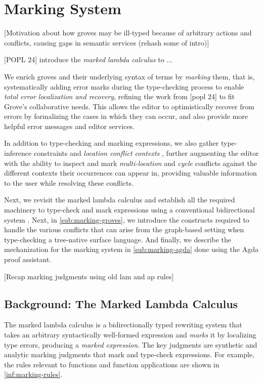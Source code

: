 
\section{Marking System}%
\label{sec:Marking System}

[Motivation about how groves may be ill-typed because of arbitrary actions and conflicts, causing gaps in semantic services (rehash some of intro)]

[POPL 24] introduce the \emph{marked lambda calculus} to ...

We enrich groves and their underlying syntax of terms by \emph{marking} them, that is, systematically adding error marks during the type-checking process to enable \emph{total error localization and recovery}, refining the work from [popl 24] to fit Grove's collaborative needs. This allows the editor to optimistically recover from errors by formalizing the cases in which they can occur, and also provide more helpful error messages and editor services.

In addition to type-checking and marking expressions, we also gather type-inference constraints and \emph{location conflict contexts} , further augmenting the editor with the ability to inspect and mark \emph{multi-location} and \emph{cycle} conflicts against the different contexts their occurrences can appear in, providing valuable information to the user while resolving these conflicts.

Next, we revisit the marked lambda calculus and establish all the required machinery to type-check and mark expressions using a conventional bidirectional system . Next, in \autoref{sub:marking-groves}, we introduce the constructs required to handle the various conflicts that can arise from the graph-based setting when type-checking a tree-native surface language. And finally, we describe the mechanization for the marking system in \autoref{sub:marking-agda} done using the Agda  proof assistant.

[Recap marking judgments using old lam and ap rules]

\subsection{Background: The Marked Lambda Calculus}

The marked lambda calculus is a bidirectionally typed rewriting system that takes an arbitrary syntactically well-formed expression and \emph{marks} it by localizing type errors, producing a \emph{marked expression}. The key judgments are synthetic and analytic marking judgments that mark and type-check expressions. For example, the rules relevant to functions and function applications are shown in \autoref{inf:marking-rules}.

